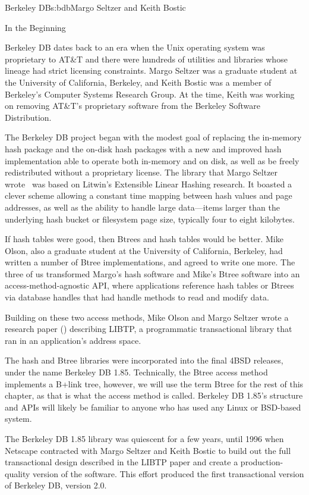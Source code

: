 \begin{aosachapter}{Berkeley DB}{s:bdb}{Margo Seltzer and Keith Bostic}
\begin{aosasect1}{In the Beginning}

Berkeley DB dates back to an era when the Unix operating system was
proprietary to AT\&T and there were hundreds of utilities and libraries
whose lineage had strict licensing constraints. Margo Seltzer was a
graduate student at the University of California, Berkeley, and Keith
Bostic was a member of Berkeley's Computer Systems Research Group. At
the time, Keith was working on removing AT\&T's proprietary software
from the Berkeley Software Distribution.

The Berkeley DB project began with the modest goal of replacing the
in-memory  hash package and the on-disk  hash
packages with a new and improved hash implementation able to operate
both in-memory and on disk, as well as be freely redistributed without
a proprietary license. The  library that Margo Seltzer
wrote~\cite{bib:seltzer:hash} was based on
Litwin's Extensible Linear Hashing research. It boasted a clever
scheme allowing a constant time mapping between hash values and page
addresses, as well as the ability to handle large data---items
larger than the underlying hash bucket or filesystem page size,
typically four to eight kilobytes.

If hash tables were good, then Btrees and hash tables would be better.
Mike Olson, also a graduate student at the University of California,
Berkeley, had written a number of Btree implementations, and agreed to
write one more. The three of us transformed Margo's hash software and
Mike's Btree software into an access-method-agnostic API, where
applications reference hash tables or Btrees via database handles
that had handle methods to read and modify data.

Building on these two access methods, Mike Olson and Margo Seltzer
wrote a research paper (\cite{bib:seltzer:libtp}) describing LIBTP, a
programmatic transactional library that ran in an application's
address space.

The hash and Btree libraries were incorporated into the final 4BSD
releases, under the name Berkeley DB 1.85.  Technically, the Btree
access method implements a B+link tree, however, we will use the
term Btree for the rest of this chapter, as that is what the access
method is called.
Berkeley DB 1.85's
structure and APIs will likely be familiar to anyone who has used any
Linux or BSD-based system.

The Berkeley DB 1.85 library was quiescent for a few years, until 1996
when Netscape contracted with Margo Seltzer and Keith Bostic to build
out the full transactional design described in the LIBTP paper and
create a production-quality version of the software. This effort
produced the first transactional version of Berkeley DB, version 2.0.


\end{aosasect1}
\end{aosachapter}
